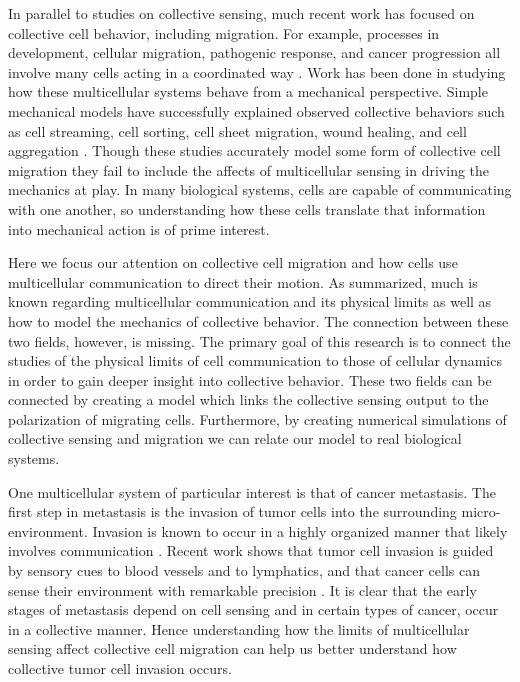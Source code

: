 \documentclass[phys,prelim]{puthesis}
\begin{document}
In parallel to studies on collective sensing, much recent work has focused on collective cell behavior, including migration. For example, processes in development, cellular migration, pathogenic response, and cancer progression all involve many cells acting in a coordinated way \cite{friedl2010plasticity,rasmussen2006quorum,boelens2014exosome,cheung2013collective,vader2014extracellular}. Work has been done in studying how these multicellular systems behave from a mechanical perspective. Simple mechanical models have successfully explained observed collective behaviors such as cell streaming, cell sorting, cell sheet migration, wound healing, and cell aggregation \cite{kabla2012collective,szabo2010collective,basan2013alignment,janulevicius2015short}. Though these studies accurately model some form of collective cell migration they fail to include the affects of multicellular sensing in driving the mechanics at play. In many biological systems, cells are capable of communicating with one another, so understanding how these cells translate that information into mechanical action is of prime interest.

Here we focus our attention on collective cell migration and how cells use multicellular communication to direct their motion. As summarized, much is known regarding multicellular communication and its physical limits as well as how to model the mechanics of collective behavior. The connection between these two fields, however, is missing. The primary goal of this research is to connect the studies of the physical limits of cell communication to those of cellular dynamics in order to gain deeper insight into collective behavior. These two fields can be connected by creating a model which links the collective sensing output to the polarization of migrating cells. Furthermore, by creating numerical simulations of collective sensing and migration we can relate our model to real biological systems.

One multicellular system of particular interest is that of cancer metastasis. The first step in metastasis is the invasion of tumor cells into the surrounding micro-environment. Invasion is known to occur in a highly organized manner that likely involves communication \cite{cheung2013collective,friedl2012classifying,vader2014extracellular}. Recent work shows that tumor cell invasion is guided by sensory cues to blood vessels and to lymphatics, and that cancer cells can sense their environment with remarkable precision \cite{shields2007autologous}. It is clear that the early stages of metastasis depend on cell sensing and in certain types of cancer, occur in a collective manner. Hence understanding how the limits of multicellular sensing affect collective cell migration can help us better understand how collective tumor cell invasion occurs.
\end{document}
